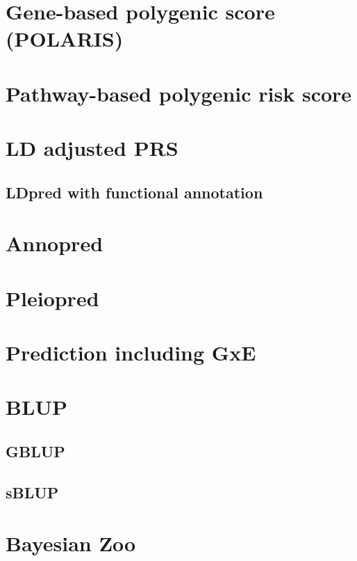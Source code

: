 \documentclass[]{book}
\theoremstyle{definition}
\theoremstyle{definition}
\theoremstyle{definition}
\theoremstyle{remark}
\begin{document}
\section{Gene-based polygenic score
(POLARIS)}\label{gene-based-polygenic-score-polaris}

\section{Pathway-based polygenic risk
score}\label{pathway-based-polygenic-risk-score}

\section{LD adjusted PRS}\label{ld-adjusted-prs}

\subsection{LDpred with functional
annotation}\label{ldpred-with-functional-annotation}

\section{Annopred}\label{annopred}

\section{Pleiopred}\label{pleiopred}

\section{Prediction including GxE}\label{prediction-including-gxe}

\section{BLUP}\label{blup}

\subsection{GBLUP}\label{gblup}

\subsection{sBLUP}\label{sblup}

\section{Bayesian Zoo}\label{bayesian-zoo}
\end{document}
